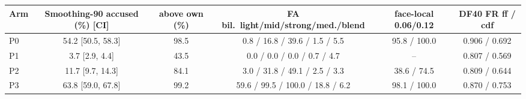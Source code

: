 \begin{tabular}{@{}l c c c c c@{}}
\toprule
Arm & Smoothing-90 accused (\%) [CI] & above own (\%) & FA bil.\ light/mid/strong/med./blend & face-local 0.06/0.12 & DF40 FR ff / cdf \\
\midrule
P0 & 54.2 [50.5, 58.3] & 98.5 & 0.8 / 16.8 / 39.6 / 1.5 / 5.5 & 95.8 / 100.0 & 0.906 / 0.692 \\
P1 & 3.7 [2.9, 4.4] & 43.5 & 0.0 / 0.0 / 0.0 / 0.7 / 4.7 & -- & 0.807 / 0.569 \\
P2 & 11.7 [9.7, 14.3] & 84.1 & 3.0 / 31.8 / 49.1 / 2.5 / 3.3 & 38.6 / 74.5 & 0.809 / 0.644 \\
P3 & 63.8 [59.0, 67.8] & 99.2 & 59.6 / 99.5 / 100.0 / 18.8 / 6.2 & 98.1 / 100.0 & 0.870 / 0.753 \\
\bottomrule
\end{tabular}
